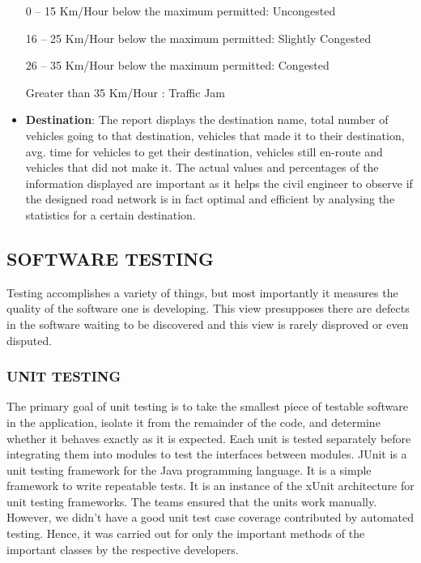 \documentclass[11pt,a4paper]{article}
\begin{document}
\begin{itemize}
		0 -- 15 Km/Hour below the maximum permitted: Uncongested
  		 
		16 -- 25 Km/Hour below the maximum permitted: Slightly Congested
  		 
		26 -- 35 Km/Hour below the maximum permitted: Congested
  		
  		Greater than 35 Km/Hour : Traffic Jam  
  	
	\item \textbf{Destination}: The report displays the destination name, total number of vehicles going to that destination, vehicles that made it to their destination, avg. time for vehicles to get their destination, vehicles still en-route and vehicles that did not make it. The actual values and percentages of the information displayed are important as it helps the civil engineer to observe if the designed road network is in fact optimal and efficient by analysing the statistics for a certain destination.
  \end{itemize}
  
\subsection{SOFTWARE TESTING}
	Testing accomplishes a variety of things, but most importantly it
	measures the quality of the software one is developing. This view
	presupposes there are defects in the software waiting to be
	discovered and this view is rarely disproved or even disputed. \cite{testingPurp}
	
	\subsubsection{UNIT TESTING}
	The primary goal of unit testing is to take the smallest piece of
	testable software in the application, isolate it from the remainder
	of the code, and determine whether it behaves exactly as it is
	expected. Each unit is tested separately before integrating them
	into modules to test the interfaces between modules. \cite{mdsn03}
	JUnit is a unit testing framework for the Java programming
	language.\cite{junitwiki} It is a simple framework to write
	repeatable tests. It is an instance of the xUnit architecture for
	unit testing frameworks.	\cite{junit}
	The teams ensured that the units work manually. However, we didn’t have
	a good unit test case coverage contributed by automated testing. Hence,
	it was carried out for only the important methods of the important
	classes by the respective developers.
	
\end{document}
